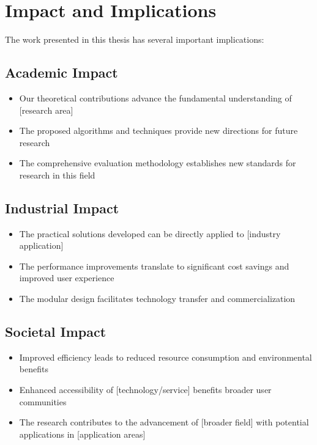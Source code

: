 \section{Impact and Implications}

The work presented in this thesis has several important implications:

\subsection{Academic Impact}

\begin{itemize}
    \item Our theoretical contributions advance the fundamental understanding of [research area]
    \item The proposed algorithms and techniques provide new directions for future research
    \item The comprehensive evaluation methodology establishes new standards for research in this field
\end{itemize}

\subsection{Industrial Impact}

\begin{itemize}
    \item The practical solutions developed can be directly applied to [industry application]
    \item The performance improvements translate to significant cost savings and improved user experience
    \item The modular design facilitates technology transfer and commercialization
\end{itemize}

\subsection{Societal Impact}

\begin{itemize}
    \item Improved efficiency leads to reduced resource consumption and environmental benefits
    \item Enhanced accessibility of [technology/service] benefits broader user communities
    \item The research contributes to the advancement of [broader field] with potential applications in [application areas]
\end{itemize}

